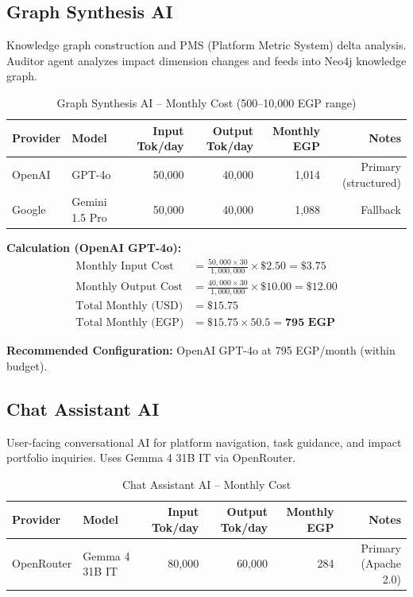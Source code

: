 \documentclass[11pt,a4paper]{article}
\begin{document}
\subsection{Graph Synthesis AI}

Knowledge graph construction and PMS (Platform Metric System) delta analysis. Auditor agent analyzes impact dimension changes and feeds into Neo4j knowledge graph.

\begin{table}[H]
\centering
\begin{tabular}{|l|l|r|r|r|r|}
\hline
\textbf{Provider} & \textbf{Model} & \textbf{Input Tok/day} & \textbf{Output Tok/day} & \textbf{Monthly EGP} & \textbf{Notes} \\
\hline
OpenAI & GPT-4o & 50,000 & 40,000 & 1,014 & Primary (structured) \\
\hline
Google & Gemini 1.5 Pro & 50,000 & 40,000 & 1,088 & Fallback \\
\hline
\end{tabular}
\caption{Graph Synthesis AI -- Monthly Cost (500--10,000 EGP range)}
\end{table}

\noindent\textbf{Calculation (OpenAI GPT-4o):}
\begin{align*}
\text{Monthly Input Cost} &= \frac{50{,}000 \times 30}{1{,}000{,}000} \times \$2.50 = \$3.75 \\
\text{Monthly Output Cost} &= \frac{40{,}000 \times 30}{1{,}000{,}000} \times \$10.00 = \$12.00 \\
\text{Total Monthly (USD)} &= \$15.75 \\
\text{Total Monthly (EGP)} &= \$15.75 \times 50.5 = \textbf{795 EGP}
\end{align*}

\textbf{Recommended Configuration:} OpenAI GPT-4o at 795 EGP/month (within budget).

\subsection{Chat Assistant AI}

User-facing conversational AI for platform navigation, task guidance, and impact portfolio inquiries. Uses Gemma 4 31B IT via OpenRouter.

\begin{table}[H]
\centering
\begin{tabular}{|l|l|r|r|r|r|}
\hline
\textbf{Provider} & \textbf{Model} & \textbf{Input Tok/day} & \textbf{Output Tok/day} & \textbf{Monthly EGP} & \textbf{Notes} \\
\hline
OpenRouter & Gemma 4 31B IT & 80,000 & 60,000 & 284 & Primary (Apache 2.0) \\
\hline
\end{tabular}
\caption{Chat Assistant AI -- Monthly Cost}
\end{table}
\end{document}
